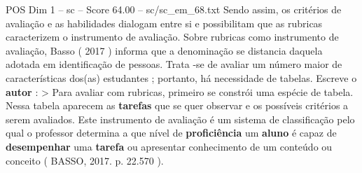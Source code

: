 \begin{textsample}{POS Dim 1 – sc – Score 64.00 – sc/sc\_em\_68.txt}
Sendo assim, os critérios de avaliação e as habilidades dialogam entre si e possibilitam que as rubricas caracterizem o instrumento de avaliação.
Sobre rubricas como instrumento de avaliação, Basso ( 2017 ) informa que a denominação se distancia daquela adotada em identificação de pessoas.
Trata -se de avaliar um número maior de características dos(as) estudantes ; portanto, há necessidade de tabelas.
Escreve o \textbf{autor} : > Para avaliar com rubricas, primeiro se constrói uma espécie de tabela.
Nessa tabela aparecem as \textbf{tarefas} que se quer observar e os possíveis critérios a serem avaliados.
Este instrumento de avaliação é um sistema de classificação pelo qual o professor determina a que nível de \textbf{proficiência} um \textbf{aluno} é capaz de \textbf{desempenhar} uma \textbf{tarefa} ou apresentar conhecimento de um conteúdo ou conceito ( BASSO, 2017. p. 22.570 ).

\end{textsample}
